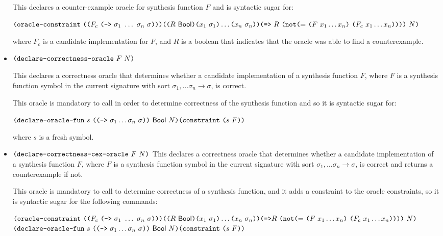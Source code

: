 \documentclass[english,a4paper,10pt]{article}
\begin{document}
\begin{itemize}
This declares a counter-example oracle for synthesis function $F$ and is syntactic sugar for:

$\texttt{(}\texttt{oracle-constraint}\mbox{ }
\texttt{(}\texttt{(}F_c \mbox{ } \texttt{(}\texttt{->} \mbox{ } \sigma_1 \mbox{ } \ldots \mbox{ } \sigma_n \mbox{ } \sigma\texttt{)}\texttt{)}\texttt{)}
\texttt{(}\texttt{(}R \mbox{ } \mathsf{Bool}\texttt{)} \texttt{(}x_1\mbox{ }\sigma_1\texttt{)} \ldots \texttt{(}x_n\mbox{ }\sigma_n\texttt{)} \texttt{)} \\
\texttt{(}\texttt{=>} \mbox{ } R  \mbox{ } \texttt{(}{\tt not} \texttt{(}{\tt=}\mbox{ } \texttt{(}F \mbox{ } x_1 \ldots x_n\texttt{)} \mbox{ } \texttt{(}F_c \mbox{ }x_1 \ldots x_n \texttt{)}\texttt{)}\texttt{)}\texttt{)} \mbox{ } N\texttt{)}
$

where $F_c$ is a candidate implementation for $F$, and $R$ is a boolean that indicates that the oracle was able to find a counterexample.


\item$\texttt{(}\texttt{declare-correctness-oracle}\mbox{ }F\mbox{ } N\texttt{)} $

This declares a correctness oracle that determines whether a candidate implementation of a synthesis function $F$,
where $F$ is a synthesis function symbol in the current signature
with sort $\sigma_1, \ldots \sigma_n \rightarrow \sigma$, is correct. 


This oracle is mandatory to call in order to determine correctness of the synthesis function and so it is syntactic sugar for:

$\paren{\oracledeckwd\mbox{ }s\mbox{ }\paren{
\paren{
\funsortkwd \mbox{ } \sigma_1 \ldots \sigma_n\mbox{ }\sigma }}
\mbox{ }\sbool \mbox{ } N}\\
%
\paren{\constraintkwd \mbox{ } \paren{s \mbox{ } F}}
$

where $s$ is a fresh symbol. 

\item$\texttt{(}\texttt{declare-correctness-cex-oracle}\mbox{ } F\mbox{ }N\texttt{)} $
This declares a correctness oracle that determines whether a candidate implementation of a synthesis function $F$,
where $F$ is a synthesis function symbol in the current signature
with sort $\sigma_1, \ldots \sigma_n \rightarrow \sigma$, is correct and returns a counterexample if not.

This oracle is mandatory to call to determine correctness of a synthesis function, and it adds a constraint to the oracle constraints, so it is syntactic sugar for the following commands:

$
\texttt{(}\texttt{oracle-constraint}\mbox{ } 
\texttt{(}\texttt{(}F_c \mbox{ } \texttt{(}\texttt{->} \mbox{ } \sigma_1 \mbox{ } \ldots \mbox{ } \sigma_n \mbox{ } \sigma\texttt{)}\texttt{)}\texttt{)}
\texttt{(}\texttt{(}R \mbox{ } \mathsf{Bool}\texttt{)} \texttt{(}x_1\mbox{ }\sigma_1\texttt{)} \ldots \texttt{(}x_n\mbox{ }\sigma_n\texttt{)} \texttt{)} \\
\texttt{(}\texttt{=>} R  \mbox{ } \texttt{(}{\tt not} \texttt{(}{\tt=}\mbox{ } \texttt{(}F \mbox{ } x_1 \ldots x_n\texttt{)} \mbox{ } \texttt{(}F_c \mbox{ }x_1 \ldots x_n \texttt{)}\texttt{)}\texttt{)}\texttt{)}\mbox{ }N\texttt{)} \\
$
$
\paren{\oracledeckwd\mbox{ }s\mbox{ }\paren{
\paren{
\funsortkwd \mbox{ } \sigma_1 \ldots \sigma_n\mbox{ }\sigma }}
\mbox{ }\sbool \mbox{ }N}\\
%
\paren{\constraintkwd \mbox{ } \paren{s \mbox{ } F}}
$


\end{itemize}
\end{document}

